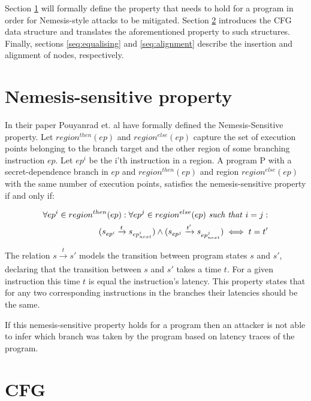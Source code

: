 Section \ref{sec:property} will formally define the property that needs to hold for a program in order for Nemesis-style attacks to be mitigated. Section \ref{sec:cfg} 
introduces the CFG data structure and translates the aforementioned property to such structures. Finally, sections \ref{seq:equalising} and \ref{seq:alignment} describe the insertion and alignment of nodes, respectively. 

\section{Nemesis-sensitive property}\label{sec:property}
In their paper Pouyanrad et. al have formally defined the Nemesis-Sensitive property.  Let $region^{then}(ep)$ and $region^{else}(ep)$ capture the set of execution points belonging to the branch target and the other region of some branching instruction $ep$. Let $ep^i$ be the i'th instruction in a region. A program P with a secret-dependence branch in $ep$ and $region^{then}(ep)$ 
and region $region^{else}(ep)$ with the same number of execution points, satisfies the nemesis-sensitive property if and only if:  

\begin{equation} \label{eq:nemesisProperty}
    \begin{split}
    \forall ep^i \in region^{then}(ep) : \forall ep^j \in region^{else}(ep) \text{ \textit{such that} } i=j :  \\ 
    (s_{ep^i} \xrightarrow[]{t} s_{ep^i_{next}}) \land (s_{ep^j} \xrightarrow[]{t'} s_{ep^j_{next}}) \iff t = t' \\ 
    \end{split}
\end{equation}
\cite{MSP430Detection}

The relation $s \xrightarrow[]{t} s'$ models the transition between program states $s$ and $s'$, declaring that the transition between $s$ and $s'$ takes a time $t$. 
For a given instruction this time $t$ is equal the instruction's latency. This property states that for any two corresponding instructions in the branches their latencies should be the same.

If this nemesis-sensitive property holds for a program then an attacker is not able to infer which branch was taken by the program based on latency traces of the program.

\section{CFG}\label{sec:cfg}

